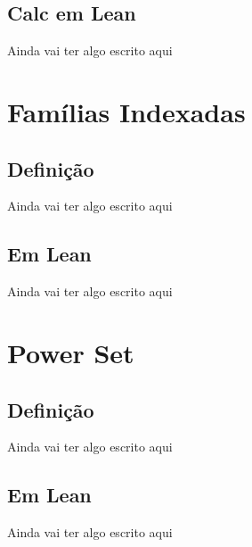   \subsection{Calc em Lean}
  Ainda vai ter algo escrito aqui

\section{Famílias Indexadas}

  \subsection{Definição}
  Ainda vai ter algo escrito aqui

  \subsection{Em Lean}
  Ainda vai ter algo escrito aqui

\section{Power Set}

  \subsection{Definição}
  Ainda vai ter algo escrito aqui

  \subsection{Em Lean}
  Ainda vai ter algo escrito aqui


